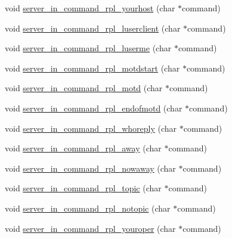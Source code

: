 \begin{DoxyCompactItemize}
\item 
void \hyperlink{G-2313-06-P2__client__function__handlers_8h_a3f4cf6c0d74b06a0916f7a9619972eee}{server\+\_\+in\+\_\+command\+\_\+rpl\+\_\+yourhost} (char $\ast$command)
\item 
void \hyperlink{G-2313-06-P2__client__function__handlers_8h_af5091cf59cbab7ce259c405c019fa8dd}{server\+\_\+in\+\_\+command\+\_\+rpl\+\_\+luserclient} (char $\ast$command)
\item 
void \hyperlink{G-2313-06-P2__client__function__handlers_8h_a5764225aa28906c7ccebf0996b2c5a08}{server\+\_\+in\+\_\+command\+\_\+rpl\+\_\+luserme} (char $\ast$command)
\item 
void \hyperlink{G-2313-06-P2__client__function__handlers_8h_acd688f18855dcb6ee9bf10a72e0c8f6c}{server\+\_\+in\+\_\+command\+\_\+rpl\+\_\+motdstart} (char $\ast$command)
\item 
void \hyperlink{G-2313-06-P2__client__function__handlers_8h_a774c98f4ea94eb6f92a5b22d33030674}{server\+\_\+in\+\_\+command\+\_\+rpl\+\_\+motd} (char $\ast$command)
\item 
void \hyperlink{G-2313-06-P2__client__function__handlers_8h_ad22233e08c30cad9e0598f80b5b38744}{server\+\_\+in\+\_\+command\+\_\+rpl\+\_\+endofmotd} (char $\ast$command)
\item 
void \hyperlink{G-2313-06-P2__client__function__handlers_8h_a86782df5d9b151dd061b9831a47a2c5f}{server\+\_\+in\+\_\+command\+\_\+rpl\+\_\+whoreply} (char $\ast$command)
\item 
void \hyperlink{G-2313-06-P2__client__function__handlers_8h_add282510a7e92a90d45091e6dc3a3488}{server\+\_\+in\+\_\+command\+\_\+rpl\+\_\+away} (char $\ast$command)
\item 
void \hyperlink{G-2313-06-P2__client__function__handlers_8h_ada377e1754f9a22a2ebe0bada8838b5b}{server\+\_\+in\+\_\+command\+\_\+rpl\+\_\+nowaway} (char $\ast$command)
\item 
void \hyperlink{G-2313-06-P2__client__function__handlers_8h_abc030e3bc9ce4ad126ea2c66e304e2d5}{server\+\_\+in\+\_\+command\+\_\+rpl\+\_\+topic} (char $\ast$command)
\item 
void \hyperlink{G-2313-06-P2__client__function__handlers_8h_ab9b55bd1e18bde61e8327fcf6936d91f}{server\+\_\+in\+\_\+command\+\_\+rpl\+\_\+notopic} (char $\ast$command)
\item 
void \hyperlink{G-2313-06-P2__client__function__handlers_8h_a24bb76a5941798964a8dd18e1cfb1d81}{server\+\_\+in\+\_\+command\+\_\+rpl\+\_\+youroper} (char $\ast$command)
\item 

\end{DoxyCompactItemize}
